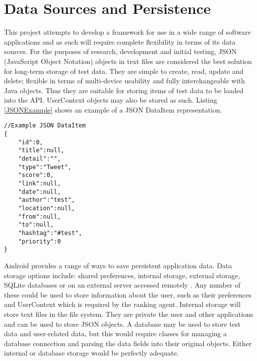 \section{Data Sources and Persistence}

This project attempts to develop a framework for use in a wide range of software applications and as such will require complete flexibility in terms of its data sources. For the purposes of research, development and initial testing, JSON (JavaScript Object Notation) objects in text files are considered the best solution for long-term storage of test data. They are simple to create, read, update and delete; flexible in terms of multi-device usability and fully interchangeable with Java objects. Thus they are suitable for storing items of test data to be loaded into the API. UserContext objects may also be stored as such. Listing \ref{JSONExample} shows an example of a JSON DataItem representation.

\lstset{language=Java, caption=JSON test data example, label=JSONExample}
\begin{lstlisting}
//Example JSON DataItem
{
	"id":0,
	"title":null,
	"detail":"",
	"type":"Tweet",	
	"score":0,
	"link":null,
	"date":null,
	"author":"test",
	"location":null,
	"from":null,
	"to":null,
	"hashtag":"#test",
	"priority":0
}
\end{lstlisting}

Android provides a range of ways to save persistent application data. Data storage options include: shared preferences, internal storage, external storage, SQLite databases or on an external server accessed remotely \cite{BeginningAndroidDataPersistence}. Any number of these could be used to store information about the user, such as their preferences and UserContext which is required by the ranking agent. 
Internal storage will store text files in the file system. They are private the user and other applications and can be used to store JSON objects. A database may be used to store test data and user-related data, but this would require classes for managing a database connection and parsing the data fields into their original objects. Either internal or database storage would be perfectly adequate.